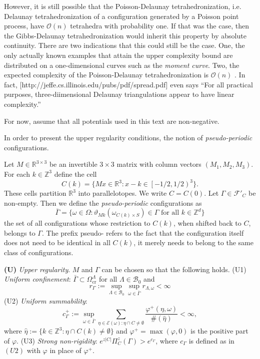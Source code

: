 \documentclass[12pt,a4paper]{report}
\newcommand{\R}{\mathbb R^3}
\begin{document}
However, it is still possible that the Poisson-Delaunay tetrahedronization, i.e. Delaunay tetrahedronization of a configuration generated by a Poisson point process, have $\mathcal O(n)$ tetrahedra with probability one. If that was the case, then the Gibbs-Delaunay tetrahedronization would inherit this property by absolute continuity. There are two indications that this could still be the case. One, the only actually known examples that attain the upper complexity bound are distributed on a one-dimensional curves such as the \textit{moment curve}. Two, the expected complexity of the Poisson-Delaunay tetrahedronization is $\mathcal O(n)$ . In fact, [http://jeffe.cs.illinois.edu/pubs/pdf/spread.pdf] even says ``For all practical purposes, three-diimensional Delaunay triangulations appear to have linear complexity.'' 

For now, assume that all potentials used in this text are non-negative.

In order to present the upper regularity conditions, the notion of \textit{pseudo-periodic} configurations. 

Let $M\in\mathbb R^{3\times 3}$ be an invertible $3\times 3$ matrix with column vectors $(M_1,M_2,M_3)$. For each $k \in \mathbb Z^3$ define the cell
$$C(k) =  \{Mx \in \R: x-k \in \left[ -1/2, 1/2 \right)^3 \}.$$
These cells partition $\R$ into parallelotopes. We write $C=C(0)$. Let $\Gamma \in \mathcal F'_C$ be non-empty. Then we define the \textit{pseudo-periodic} configurations as
$$\bar \Gamma = \{ \omega \in \Omega: \vartheta_{Mk}(\omega_{C(k)\times S}) \in \Gamma \text{ for all } k \in \mathbb Z^d \}$$
the set of all configurations whose restriction to $C(k)$, when shifted back to $C$, belongs to $\Gamma$. The prefix pseudo- refers to the fact that the configuration itself does not need to be identical in all $C(k)$, it merely needs to belong to the same class of configurations.

\textbf{(U)} \textit{Upper regularity}. $M$ and $\Gamma$ can be chosen so that the following holds. \newline
(U1) \textit{Uniform confinement}: $\bar \Gamma \subset \Omega^\Lambda_\text{cr}$ for all $\Lambda \in \mathcal B_0$ and 
$$r_\Gamma := \sup_{\Lambda\in\mathcal B_0}\sup_{\omega \in \bar\Gamma} r_{\Lambda, \omega} < \infty$$
(U2) \textit{Uniform summability}: 
$$c^+_\Gamma := \sup_{\omega \in \bar\Gamma}  \sum_{\eta \in \mathcal E(\omega): \eta \cap C \neq \emptyset} \frac{\varphi^+(\eta,\omega)}{\#(\hat\eta)} < \infty,$$
where $\hat\eta := \{k \in \mathbb Z^3: \eta \cap C(k) \neq \emptyset\}$ and $\varphi^+ = \max(\varphi,0)$ is the positive part of $\varphi$.\newline
(U3) \textit{Strong non-rigidity}: $e^{z|C|} \Pi^z_C(\Gamma) > e^{c_\Gamma}$, where $c_\Gamma$ is defined as in $(U2)$ with $\varphi$ in place of $\varphi^+$.
\end{document}
